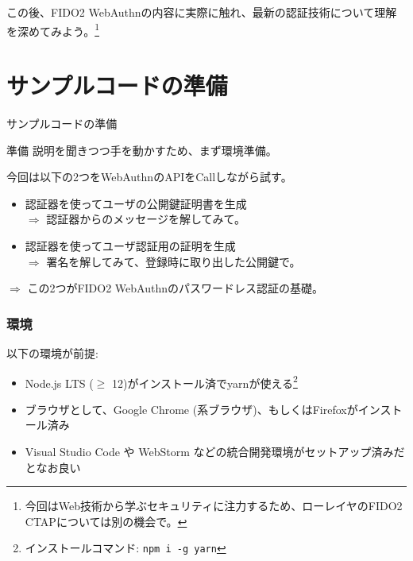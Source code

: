 \documentclass[12pt,dvipdfmx,uplatex]{beamer}
\begin{document}
\begin{frame}
この後、FIDO2 WebAuthnの内容に実際に触れ、最新の認証技術について理解を深めてみよう。\footnote[frame]{\scriptsize 今回はWeb技術から学ぶセキュリティに注力するため、ローレイヤのFIDO2 CTAPについては別の機会で。}
\end{frame}

\section{サンプルコードの準備}
\begin{frame}
\centering
{\Large サンプルコードの準備}
\end{frame}

\begin{frame}{準備}
説明を聞きつつ手を動かすため、まず環境準備。

\vspace{2ex}

今回は以下の2つをWebAuthnのAPIをCallしながら試す。
\begin{itemize}
\item 認証器を使ってユーザの公開鍵証明書を生成\\
$\Rightarrow$ 認証器からのメッセージを解してみて。
\item 認証器を使ってユーザ認証用の証明を生成\\
$\Rightarrow$ 署名を解してみて、登録時に取り出した公開鍵で。
\end{itemize}
$\Rightarrow$ この2つが\alert{FIDO2 WebAuthnのパスワードレス認証の基礎}。
\end{frame}

\begin{frame}
\frametitle{環境}

以下の環境が前提:
\begin{itemize}
 \item Node.js LTS ($\ge$ 12)がインストール済でyarnが使える\footnote[frame]{インストールコマンド: \texttt{npm i -g yarn}}
 \item ブラウザとして、Google Chrome (系ブラウザ)、もしくはFirefoxがインストール済み
 \item Visual Studio Code や WebStorm などの統合開発環境がセットアップ済みだとなお良い
\end{itemize}
\end{frame}
\end{document}
